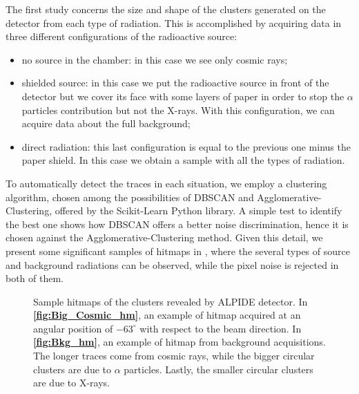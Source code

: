\documentclass[../../main/main.tex]{subfiles}
\begin{document}
The first study concerns the size and shape of the clusters generated on the detector from each type of radiation. This is accomplished by acquiring data in three different configurations of the radioactive source:
\begin{itemize}
    \item no source in the chamber: in this case we see only cosmic rays;
    \item shielded source: in this case we put the radioactive source in front of the detector but we cover its face with some layers of paper in order to stop the \( \alpha \) particles contribution but not the X-rays. With this configuration, we can acquire data about the full background;
    \item direct radiation: this last configuration is equal to the previous one minus the paper shield. In this case we obtain a sample with all the types of radiation.
\end{itemize}
To automatically detect the traces in each situation, we employ a clustering algorithm, chosen among the possibilities of DBSCAN and Agglomerative-Clustering, offered by the Scikit-Learn Python library.
A simple test to identify the best one shows how DBSCAN offers a better noise discrimination, hence it is chosen against the Agglomerative-Clustering method. Given this detail, we present some significant samples of hitmaps in , where the several types of source and background radiations can be observed, while the pixel noise is rejected in both of them.


\begin{figure}[h]
    \begin{minipage}[c]{0.49\linewidth}
        \vspace{0pt}
        \centering
    \end{minipage}
    \hfill
    \begin{minipage}[c]{0.49\linewidth}
        \vspace{0pt}
        \centering
    \end{minipage}
    \caption{Sample hitmaps of the clusters revealed by ALPIDE detector. In \textbf{\ref{fig:Big_Cosmic_hm}}, an example of hitmap acquired at an angular position of \( -63^{\circ} \) with respect to the beam direction. In \textbf{\ref{fig:Bkg_hm}}, an example of hitmap from background acquisitions. The longer traces come from cosmic rays, while the bigger circular clusters are due to \( \alpha \) particles. Lastly, the smaller circular clusters are due to X-rays.}
    \label{fig:clust_hitmap}
\end{figure}
\end{document}
